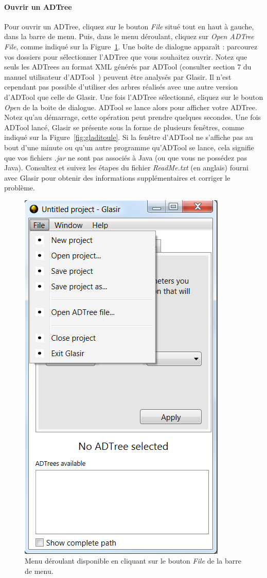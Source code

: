 \paragraph{Ouvrir un ADTree}
Pour ouvrir un ADTree, cliquez sur le bouton \emph{File} situé tout en haut à gauche, dans la barre de menu. Puis, dans le menu déroulant, cliquez sur \emph{Open ADTree File}, comme indiqué sur la {\sc Figure}~\ref{fig:file}. Une boîte de dialogue apparaît : parcourez vos dossiers pour sélectionner l'ADTree que vous souhaitez ouvrir. Notez que seuls les ADTrees au format XML générés par ADTool (consulter {\sc section} 7 du manuel utilisateur d'ADTool~\cite{ADTool_Manual}) peuvent être analysés par Glasir. Il n'est cependant pas possible d'utiliser des arbres réalisés avec une autre version d'ADTool que celle de Glasir. Une fois l'ADTree sélectionné, cliquez sur le bouton \emph{Open} de la boite de dialogue. ADTool se lance alors pour afficher votre ADTree. Notez qu'au démarrage, cette opération peut prendre quelques secondes. Une fois ADTool lancé, Glasir se présente sous la forme de plusieurs fenêtres, comme indiqué sur la {\sc Figure}~\ref{fig:gladitoule}. Si la fenêtre d'ADTool ne s'affiche pas au bout d'une minute ou qu'un autre programme qu'ADTool se lance, cela signifie que vos fichiers \emph{.jar} ne sont pas associés à Java (ou que vous ne possédez pas Java). Consultez et suivez les étapes du fichier \emph{ReadMe.txt} (en anglais) fourni avec Glasir pour obtenir des informations supplémentaires et corriger le problème.

	\begin{figure}[H]
        \centering
        \includegraphics[height=0.7\textwidth]{figure/openfile.png}
        \caption{Menu déroulant disponible en cliquant sur le bouton \emph{File} de la barre de menu.}
        \label{fig:file}
    \end{figure}
    
